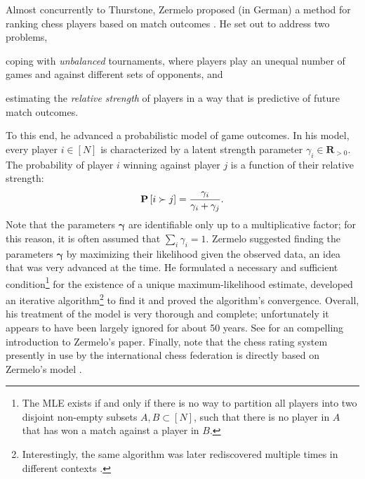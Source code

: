 Almost concurrently to Thurstone, Zermelo proposed (in German) a method for ranking chess players based on match outcomes \citep{zermelo1928berechnung}.
He set out to address two problems,
\begin{enuminline}
\item coping with \emph{unbalanced} tournaments, where players play an unequal number of games and against different sets of opponents, and
\item estimating the \emph{relative strength} of players in a way that is predictive of future match outcomes.
\end{enuminline}
To this end, he advanced a probabilistic model of game outcomes.
In his model, every player $i \in [N]$ is characterized by a latent strength parameter $\gamma_i \in \mathbf{R}_{>0}$.
The probability of player $i$ winning against player $j$ is a function of their relative strength:
\begin{align}
\label{in:eq:zermelo}
\mathbf{P}\left[ i \succ j \right] = \frac{\gamma_i}{\gamma_i + \gamma_j}.
\end{align}
Note that the parameters $\bm{\gamma}$ are identifiable only up to a multiplicative factor;
for this reason, it is often assumed that $\sum_i \gamma_i = 1$.
Zermelo suggested finding the parameters $\bm{\gamma}$ by maximizing their likelihood given the observed data, an idea that was very advanced at the time.
He formulated a necessary and sufficient condition\footnote{%
The MLE exists if and only if there is no way to partition all players into two disjoint non-empty subsets $A, B \subset [N]$, such that there is no player in $A$ that has won a match against a player in $B$.}
for the existence of a unique maximum-likelihood estimate, developed an iterative algorithm\footnote{%
Interestingly, the same algorithm was later rediscovered multiple times in different contexts \citep{bradley1952rank, ford1957solution, dykstra1960rank, hunter2004mm, caron2012efficient}.}
to find it and proved the algorithm's convergence.
Overall, his treatment of the model is very thorough and complete; unfortunately it appears to have been largely ignored for about 50 years.
See \citet{glickman2013introductory} for an compelling introduction to Zermelo's paper.
Finally, note that the chess rating system presently in use by the international chess federation is directly based on Zermelo's model \citep{elo1978rating}.


